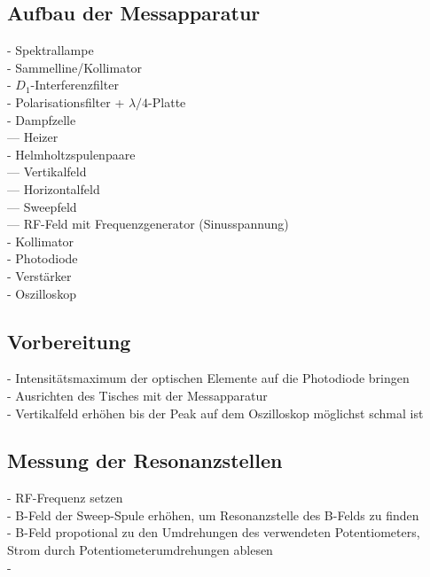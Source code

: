 \subsection{Aufbau der Messapparatur}
- Spektrallampe\\
- Sammelline/Kollimator\\
- $D_{1}$-Interferenzfilter\\
- Polarisationsfilter + $\lambda/4$-Platte\\
- Dampfzelle\\
  --- Heizer\\
- Helmholtzspulenpaare\\
  --- Vertikalfeld\\
  --- Horizontalfeld\\
  --- Sweepfeld\\
  --- RF-Feld mit Frequenzgenerator (Sinusspannung)\\
- Kollimator\\
- Photodiode\\
- Verstärker\\
- Oszilloskop\\


\subsection{Vorbereitung}
- Intensitätsmaximum der optischen Elemente auf die Photodiode bringen\\
- Ausrichten des Tisches mit der Messapparatur\\
- Vertikalfeld erhöhen bis der Peak auf dem Oszilloskop möglichst schmal ist\\

\subsection{Messung der Resonanzstellen}
- RF-Frequenz setzen\\
- B-Feld der Sweep-Spule erhöhen, um Resonanzstelle des B-Felds zu finden\\
- B-Feld propotional zu den Umdrehungen des verwendeten Potentiometers, Strom durch Potentiometerumdrehungen ablesen\\
-
